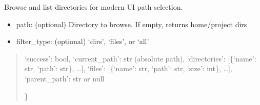 \documentclass[a4paper,11pt,english,openany,oneside]{sphinxmanual}
\begin{document}

\begin{fulllineitems}
\label{\detokenize{modules/api:app.api.browse_directory}}
\pysigstartsignatures
\pysiglinewithargsret
{}
{}
{}
\pysigstopsignatures
\sphinxAtStartPar
Browse and list directories for modern UI path selection.
\begin{description}
\begin{itemize}
\item {} 
\sphinxAtStartPar
path: (optional) Directory to browse. If empty, returns home/project dirs

\item {} 
\sphinxAtStartPar
filter\_type: (optional) ‘dirs’, ‘files’, or ‘all’

\end{itemize}

\end{description}
\begin{quote}\begin{description}
\sphinxAtStartPar
\begin{description}
\sphinxlineitem{\{}
\sphinxAtStartPar
‘success’: bool,
‘current\_path’: str (absolute path),
‘directories’: {[}\{‘name’: str, ‘path’: str\}, …{]},
‘files’: {[}\{‘name’: str, ‘path’: str, ‘size’: int\}, …{]},
‘parent\_path’: str or null

\end{description}

\sphinxAtStartPar
\}


\end{description}\end{quote}

\end{fulllineitems}

\end{document}
